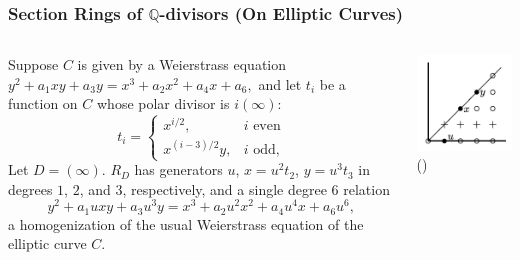 \documentclass[handout]{beamer}
\numberwithin{equation}{section}
\numberwithin{case}{theorem}
\newcommand{\bbQ}{\mathbb{Q}}		%
\newcommand{\<}{\left\langle}
\renewcommand{\>}{\right\rangle}
\begin{document}
	\begin{frame}
		\frametitle{Section Rings of $\bbQ$-divisors (On Elliptic Curves)}
		\begin{example}
			\begin{columns}
				\begin{column}{.5\textwidth}
				Suppose $C$ is given by a Weierstrass equation $y^2 + a_1xy + a_3y = x^3 + a_2x^2 + a_4x + a_6,$ and let $t_i$ be a function on $C$ whose polar divisor is $i(\infty):$ 
				\[
				t_i = \begin{cases}
					x^{i/2}, & \text{$i$ even} \\
					x^{(i-3)/2}y, & \text{$i$ odd,}
				\end{cases}\] \pause
				Let $D = (\infty).$\pause 
				$R_D$ has generators $u$, $x = u^2 t_2$, $y = u^3 t_3$ in degrees $1$, $2$, and $3$, respectively, \pause and a single degree $6$ relation
				\[
				y^2 + a_1 u x y + a_3 u^3 y = x^3 + a_2 u^2 x^2 + a_4 u^4 x + a_6 u^6,
				\]
				a homogenization of the usual Weierstrass equation of the elliptic curve $C$.
				\end{column} \pause
				\begin{column}{.5\textwidth}
					\includegraphics[scale=1.5]{1pt_Qdiv.png}\\
					(\cite[Figure $1$]{Cerchia-Franklin-ODorney-Qdiv-Ell-curves})\\
					$~$\\
					$~$\\
					$~$\\
					$~$\\
					$~$\\
				\end{column}
			\end{columns}
		\end{example}
	\end{frame}
	
\end{document}
